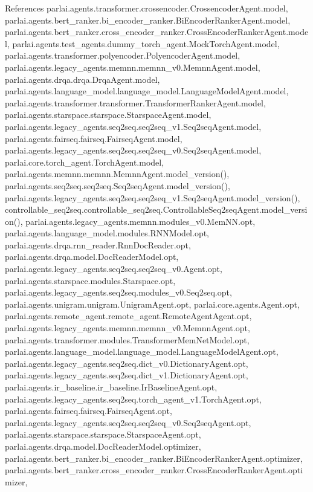 References parlai.\+agents.\+transformer.\+crossencoder.\+Crossencoder\+Agent.\+model, parlai.\+agents.\+bert\+\_\+ranker.\+bi\+\_\+encoder\+\_\+ranker.\+Bi\+Encoder\+Ranker\+Agent.\+model, parlai.\+agents.\+bert\+\_\+ranker.\+cross\+\_\+encoder\+\_\+ranker.\+Cross\+Encoder\+Ranker\+Agent.\+model, parlai.\+agents.\+test\+\_\+agents.\+dummy\+\_\+torch\+\_\+agent.\+Mock\+Torch\+Agent.\+model, parlai.\+agents.\+transformer.\+polyencoder.\+Polyencoder\+Agent.\+model, parlai.\+agents.\+legacy\+\_\+agents.\+memnn.\+memnn\+\_\+v0.\+Memnn\+Agent.\+model, parlai.\+agents.\+drqa.\+drqa.\+Drqa\+Agent.\+model, parlai.\+agents.\+language\+\_\+model.\+language\+\_\+model.\+Language\+Model\+Agent.\+model, parlai.\+agents.\+transformer.\+transformer.\+Transformer\+Ranker\+Agent.\+model, parlai.\+agents.\+starspace.\+starspace.\+Starspace\+Agent.\+model, parlai.\+agents.\+legacy\+\_\+agents.\+seq2seq.\+seq2seq\+\_\+v1.\+Seq2seq\+Agent.\+model, parlai.\+agents.\+fairseq.\+fairseq.\+Fairseq\+Agent.\+model, parlai.\+agents.\+legacy\+\_\+agents.\+seq2seq.\+seq2seq\+\_\+v0.\+Seq2seq\+Agent.\+model, parlai.\+core.\+torch\+\_\+agent.\+Torch\+Agent.\+model, parlai.\+agents.\+memnn.\+memnn.\+Memnn\+Agent.\+model\+\_\+version(), parlai.\+agents.\+seq2seq.\+seq2seq.\+Seq2seq\+Agent.\+model\+\_\+version(), parlai.\+agents.\+legacy\+\_\+agents.\+seq2seq.\+seq2seq\+\_\+v1.\+Seq2seq\+Agent.\+model\+\_\+version(), controllable\+\_\+seq2seq.\+controllable\+\_\+seq2seq.\+Controllable\+Seq2seq\+Agent.\+model\+\_\+version(), parlai.\+agents.\+legacy\+\_\+agents.\+memnn.\+modules\+\_\+v0.\+Mem\+N\+N.\+opt, parlai.\+agents.\+language\+\_\+model.\+modules.\+R\+N\+N\+Model.\+opt, parlai.\+agents.\+drqa.\+rnn\+\_\+reader.\+Rnn\+Doc\+Reader.\+opt, parlai.\+agents.\+drqa.\+model.\+Doc\+Reader\+Model.\+opt, parlai.\+agents.\+legacy\+\_\+agents.\+seq2seq.\+seq2seq\+\_\+v0.\+Agent.\+opt, parlai.\+agents.\+starspace.\+modules.\+Starspace.\+opt, parlai.\+agents.\+legacy\+\_\+agents.\+seq2seq.\+modules\+\_\+v0.\+Seq2seq.\+opt, parlai.\+agents.\+unigram.\+unigram.\+Unigram\+Agent.\+opt, parlai.\+core.\+agents.\+Agent.\+opt, parlai.\+agents.\+remote\+\_\+agent.\+remote\+\_\+agent.\+Remote\+Agent\+Agent.\+opt, parlai.\+agents.\+legacy\+\_\+agents.\+memnn.\+memnn\+\_\+v0.\+Memnn\+Agent.\+opt, parlai.\+agents.\+transformer.\+modules.\+Transformer\+Mem\+Net\+Model.\+opt, parlai.\+agents.\+language\+\_\+model.\+language\+\_\+model.\+Language\+Model\+Agent.\+opt, parlai.\+agents.\+legacy\+\_\+agents.\+seq2seq.\+dict\+\_\+v0.\+Dictionary\+Agent.\+opt, parlai.\+agents.\+legacy\+\_\+agents.\+seq2seq.\+dict\+\_\+v1.\+Dictionary\+Agent.\+opt, parlai.\+agents.\+ir\+\_\+baseline.\+ir\+\_\+baseline.\+Ir\+Baseline\+Agent.\+opt, parlai.\+agents.\+legacy\+\_\+agents.\+seq2seq.\+torch\+\_\+agent\+\_\+v1.\+Torch\+Agent.\+opt, parlai.\+agents.\+fairseq.\+fairseq.\+Fairseq\+Agent.\+opt, parlai.\+agents.\+legacy\+\_\+agents.\+seq2seq.\+seq2seq\+\_\+v0.\+Seq2seq\+Agent.\+opt, parlai.\+agents.\+starspace.\+starspace.\+Starspace\+Agent.\+opt, parlai.\+agents.\+drqa.\+model.\+Doc\+Reader\+Model.\+optimizer, parlai.\+agents.\+bert\+\_\+ranker.\+bi\+\_\+encoder\+\_\+ranker.\+Bi\+Encoder\+Ranker\+Agent.\+optimizer, parlai.\+agents.\+bert\+\_\+ranker.\+cross\+\_\+encoder\+\_\+ranker.\+Cross\+Encoder\+Ranker\+Agent.\+optimizer, 